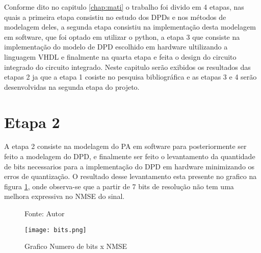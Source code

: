 Conforme dito no capitulo \ref{chap:mati} o trabalho foi divido em 4 etapas, nas quais a primeira etapa consistiu no estudo dos DPDs e nos métodos de modelagem deles, a segunda etapa consistiu na implementação desta modelagem em software, que foi optado em utilizar o python, a etapa 3 que consiste na implementação do modelo de DPD escolhido em hardware ultilizando a linguagem VHDL e finalmente na quarta etapa e feita o design do circuito integrado do circuito integrado.
Neste capitulo serão exibidos os resultados das etapas 2 ja que a etapa 1 cosiste no pesquisa bibliográfica e as etapas 3 e 4 serão desenvolvidas na segunda etapa do projeto.

\section{Etapa 2}
A etapa 2 consiste na modelagem do PA em software para posteriormente ser feito a modelagem do DPD, e finalmente ser feito o levantamento da quantidade de bits necessarios para a implementação do DPD em hardware minimizando os erros de quantização. 
O resultado desse levantamento esta presente no grafico na figura \ref{fig:bits}, onde observa-se que a partir de 7 bits de resolução não tem uma melhora expressiva no NMSE do sinal.

\begin{figure}[ht!]
    \centering
    \captionsetup{justification=centering}
    \caption*{Fonte: Autor}
    \texttt{[image: bits.png]}
    \caption{Grafico Numero de bits x NMSE}
    \label{fig:bits}
\end{figure}


